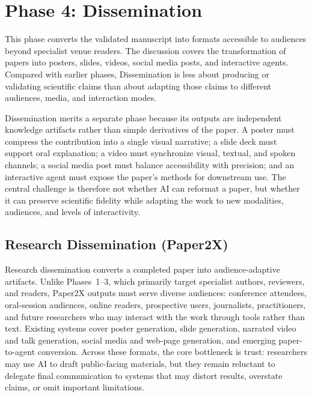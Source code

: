 \section{Phase 4: Dissemination}
\label{sec:dissemination}

This phase converts the validated manuscript into formats accessible to audiences beyond specialist venue readers. The discussion covers the transformation of papers into posters, slides, videos, social media posts, and interactive agents. Compared with earlier phases, Dissemination is less about producing or validating scientific claims than about adapting those claims to different audiences, media, and interaction modes.

Dissemination merits a separate phase because its outputs are independent knowledge artifacts rather than simple derivatives of the paper. A poster must compress the contribution into a single visual narrative; a slide deck must support oral explanation; a video must synchronize visual, textual, and spoken channels; a social media post must balance accessibility with precision; and an interactive agent must expose the paper's methods for downstream use. The central challenge is therefore not whether AI can reformat a paper, but whether it can preserve scientific fidelity while adapting the work to new modalities, audiences, and levels of interactivity.



\subsection{Research Dissemination (Paper2X)}
\label{sec:paper2x}

Research dissemination converts a completed paper into audience-adaptive artifacts. Unlike Phases~1--3, which primarily target specialist authors, reviewers, and readers, Paper2X outputs must serve diverse audiences: conference attendees, oral-session audiences, online readers, prospective users, journalists, practitioners, and future researchers who may interact with the work through tools rather than text. Existing systems cover poster generation, slide generation, narrated video and talk generation, social media and web-page generation, and emerging paper-to-agent conversion. Across these formats, the core bottleneck is trust: researchers may use AI to draft public-facing materials, but they remain reluctant to delegate final communication to systems that may distort results, overstate claims, or omit important limitations.

